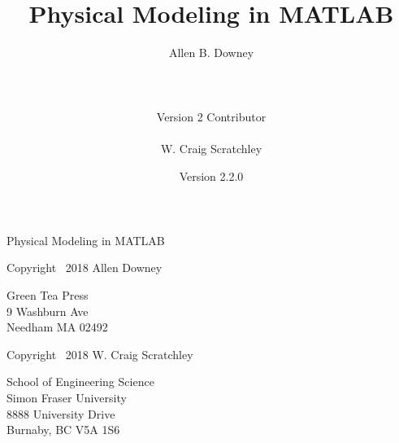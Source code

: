 \documentclass[
]{book}
\numberwithin{Answer}{chapter}
\numberwithin{Exercise}{chapter}
\newcommand{\myreg}{\textsuperscript{{\tiny \textregistered}}}
\newcommand{\thetitle}{Physical Modeling in MATLAB\myreg}
\newcommand{\theversion}{2.2.0}
\begin{document}
\frontmatter

\title {\thetitle}
\author {Allen B. Downey\\
\\
\\
\\
Version 2 Contributor\\
\\
W. Craig Scratchley\\}
\date {Version \theversion}




    \maketitle
\restoregeometry


\vspace{2in}

\begin{center}
    {\Large \thetitle}
\end{center}

\vspace{21em}

Copyright \textcopyright \, 2018 Allen Downey

\vspace{0.5em}

\begin{flushleft}
Green Tea Press       \\
9 Washburn Ave \\
Needham MA 02492
\end{flushleft}

\vspace{0.5em}

Copyright \textcopyright \, 2018 W. Craig Scratchley

\vspace{0.5em}

\begin{flushleft}
School of Engineering Science\\
Simon Fraser University\\
8888 University Drive\\
Burnaby, BC V5A 1S6
\end{flushleft}
\end{document}
